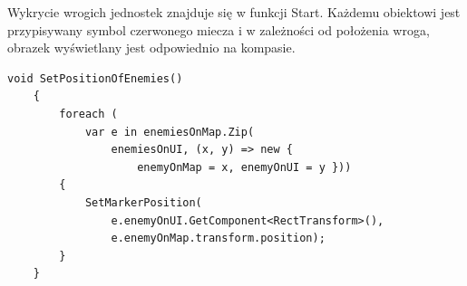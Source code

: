 Wykrycie wrogich jednostek znajduje się w funkcji Start. Każdemu obiektowi jest przypisywany symbol czerwonego miecza i w zależności od położenia wroga, obrazek wyświetlany jest odpowiednio na kompasie.
\begin{lstlisting}[caption=Fragment kodu odpowiedzialny za połączenie wrogich obiektów na mapie z symbolami wyświetlonymi na kompasie]
    void SetPositionOfEnemies()
    {
        foreach (
            var e in enemiesOnMap.Zip(
                enemiesOnUI, (x, y) => new { 
                    enemyOnMap = x, enemyOnUI = y }))
        {
            SetMarkerPosition(
                e.enemyOnUI.GetComponent<RectTransform>(),
                e.enemyOnMap.transform.position);
        }
    }
\end{lstlisting}
